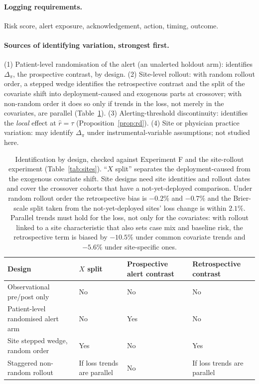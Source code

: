 \documentclass[letterpaper]{article} %
\newcommand{\rhat}{\hat r}
\begin{document}
\paragraph{Logging requirements.} Risk score, alert exposure, acknowledgement,
action, timing, outcome.

\paragraph{Sources of identifying variation, strongest first.}
(1) Patient-level randomisation of the alert (an unalerted holdout arm):
identifies $\Delta_\pi$, the prospective contrast, by design.
(2) Site-level rollout: with random rollout order, a stepped wedge identifies
the retrospective contrast and the split of the covariate shift into
deployment-caused and exogenous parts at crossover; with non-random order it
does so only if trends in the loss, not merely in the covariates, are parallel
(Table~\ref{tab:identification}).
(3) Alerting-threshold discontinuity: identifies the \emph{local} effect at
$\rhat = \tau$ (Proposition~\ref{prop:rd}).
(4) Site or physician practice variation: may identify $\Delta_\pi$ under
instrumental-variable assumptions; not studied here.

\begin{table}[t]
\centering\small
\caption{Identification by design, checked against Experiment F and the site-rollout experiment
(Table~\ref{tab:sites}). ``$X$ split'' separates the deployment-caused from the
exogenous covariate shift. Site designs need site identities and rollout dates
and cover the crossover cohorts that have a not-yet-deployed comparison. Under
random rollout order the retrospective bias is $-0.2\%$ and $-0.7\%$ and the
Brier-scale split taken from the not-yet-deployed sites' loss change is within
$2.1\%$. Parallel trends must hold for the loss, not only for the covariates:
with rollout linked to a site characteristic that also sets case mix and
baseline risk, the retrospective term is biased by $-10.5\%$ under common
covariate trends and $-5.6\%$ under site-specific ones.}
\label{tab:identification}
\begin{tabular}{llll}
\toprule
Design & $X$ split & Prospective alert contrast & Retrospective contrast\\
\midrule
Observational pre/post only & No & No & No\\
Patient-level randomised alert arm & No & Yes & No\\
Site stepped wedge, random order & Yes & No & Yes\\
Staggered non-random rollout & If loss trends are parallel & No & If loss trends are parallel\\
\bottomrule
\end{tabular}
\end{table}
\end{document}
